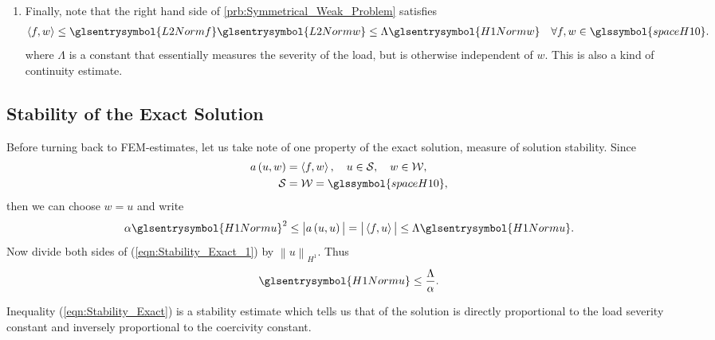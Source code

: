 \begin{enumerate}
	\item Finally, note that the right hand side of \cref{prb:Symmetrical_Weak_Problem} satisfies 
	\begin{align}	\label{eqn:Property_Load}
		\left \langle f, w \right \rangle &\leq \glsentrysymbol{L2Normf} \glsentrysymbol{L2Normw} \leq
			\Lambda \glsentrysymbol{H1Normw} & \forall f, w \in \glssymbol{spaceH10}.
	\end{align}
	where $\Lambda$ is a constant that essentially measures the severity of the load, but is otherwise independent of $w$. This is
	also a kind of continuity estimate.
\end{enumerate}
%
\subsection{Stability of the Exact Solution} \label{cha:Stability_Exact}
Before turning back to FEM-estimates, let us take note of one property of the exact solution, measure of solution stability. Since
\begin{align}
		a \left( u, w \right) &= \left \langle f, w \right \rangle,\quad u \in \mathcal{S}, \quad w \in \mathcal{W},	\\
		\mathcal{S}	&= \mathcal{W} = \glssymbol{spaceH10},
\end{align}
then we can choose $w = u$ and write
\begin{equation}	\label{eqn:Stability_Exact_1}
		\alpha \glsentrysymbol{H1Normu}^2 \leq \big \vert a \left( u, u \right) \big \vert = \big \vert \left \langle f, u \right \rangle \big \vert \leq
			\Lambda \glsentrysymbol{H1Normu}.
\end{equation}
Now divide both sides of (\ref{eqn:Stability_Exact_1}) by $\left\| u \right\|_{ H^1 }$. Thus
\begin{equation}	\label{eqn:Stability_Exact}
		\glsentrysymbol{H1Normu} \leq  \frac{ \Lambda }{ \alpha }.
\end{equation}
\begin{remark}
	Inequality (\ref{eqn:Stability_Exact}) is a stability estimate which tells us that  of the solution 
	is directly proportional to the load severity constant and inversely proportional to the coercivity constant.
\end{remark}
